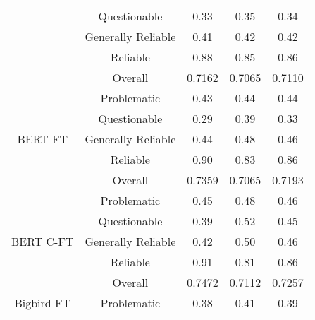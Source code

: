 \begin{table}[htbp]
\begin{longtable}{| c | c | c | c | c |}
                                                          & Questionable       & 0.33               & 0.35            & 0.34            \\
                                                          & Generally Reliable & 0.41               & 0.42            & 0.42            \\
                                                          & Reliable           & 0.88               & 0.85            & 0.86            \\\cline{2-5}
                                                          & Overall            & 0.7162             & 0.7065          & 0.7110          \\
        \hline
        \multirow{5}{*}{BERT FT}                          & Problematic        & 0.43               & 0.44            & 0.44            \\
                                                          & Questionable       & 0.29               & 0.39            & 0.33            \\
                                                          & Generally Reliable & 0.44               & 0.48            & 0.46            \\
                                                          & Reliable           & 0.90               & 0.83            & 0.86            \\\cline{2-5}
                                                          & Overall            & 0.7359             & 0.7065          & 0.7193          \\
        \hline
        \multirow{5}{*}{BERT C-FT}                        & Problematic        & 0.45               & 0.48            & 0.46            \\
                                                          & Questionable       & 0.39               & 0.52            & 0.45            \\
                                                          & Generally Reliable & 0.42               & 0.50            & 0.46            \\
                                                          & Reliable           & 0.91               & 0.81            & 0.86            \\\cline{2-5}
                                                          & Overall            & 0.7472             & 0.7112          & 0.7257          \\
        \hline
        \multirow{5}{*}{Bigbird FT}                       & Problematic        & 0.38               & 0.41            & 0.39            \\

\end{longtable}
\end{table}
